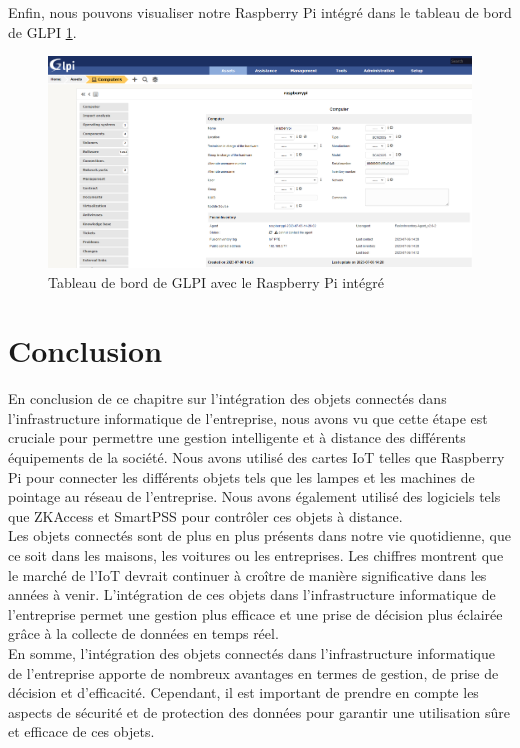 Enfin, nous pouvons visualiser notre Raspberry Pi intégré dans le tableau de bord de GLPI \ref{fig:glpi-raspberry}.

\begin{figure}[H]
\centering
\includegraphics[width=15cm]{Images/RASPBERRYPIGLPI.png}
\caption{Tableau de bord de GLPI avec le Raspberry Pi intégré}
\label{fig:glpi-raspberry}
\end{figure}

\section{Conclusion}


En conclusion de ce chapitre sur l'intégration des objets connectés dans l'infrastructure informatique de l'entreprise, nous avons vu que cette étape est cruciale pour permettre une gestion intelligente et à distance des différents équipements de la société. Nous avons utilisé des cartes IoT telles que Raspberry Pi pour connecter les différents objets tels que les lampes et les machines de pointage au réseau de l'entreprise. Nous avons également utilisé des logiciels tels que ZKAccess et SmartPSS pour contrôler ces objets à distance. \\

Les objets connectés sont de plus en plus présents dans notre vie quotidienne, que ce soit dans les maisons, les voitures ou les entreprises. Les chiffres montrent que le marché de l'IoT devrait continuer à croître de manière significative dans les années à venir. L'intégration de ces objets dans l'infrastructure informatique de l'entreprise permet une gestion plus efficace et une prise de décision plus éclairée grâce à la collecte de données en temps réel. \\

En somme, l'intégration des objets connectés dans l'infrastructure informatique de l'entreprise apporte de nombreux avantages en termes de gestion, de prise de décision et d'efficacité. Cependant, il est important de prendre en compte les aspects de sécurité et de protection des données pour garantir une utilisation sûre et efficace de ces objets. \\




